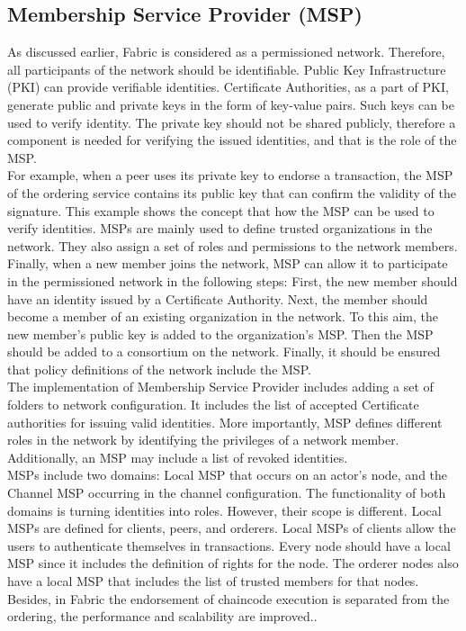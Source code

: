 \documentclass[sigconf,natbib=false]{acmart}
\begin{document}
    \subsection{Membership Service Provider (MSP)}
    As discussed earlier, Fabric is considered as a permissioned network. Therefore, all participants of the network should be identifiable. Public Key Infrastructure (PKI) can provide verifiable identities. Certificate Authorities, as a part of PKI, generate public and private keys in the form of key-value pairs. Such keys can be used to verify identity. The private key should not be shared publicly, therefore a component is needed for verifying the issued identities, and that is the role of the MSP.\\
    For example, when a peer uses its private key to endorse a transaction, the MSP of the ordering service contains its public key that can confirm the validity of the signature. This example shows the concept that how the MSP can be used to verify identities. MSPs are mainly used to define trusted organizations in the network. They also assign a set of roles and permissions to the network members. Finally, when a new member joins the network, MSP can allow it to participate in the permissioned network in the following steps:
    First, the new member should have an identity issued by a Certificate Authority. Next, the member should become a member of an existing organization in the network. To this aim, the new member's public key is added to the organization's MSP. Then the MSP should be added to a consortium on the network. Finally, it should be ensured that policy definitions of the network include the MSP.\\
    The implementation of Membership Service Provider includes adding a set of folders to network configuration. It includes the list of accepted Certificate authorities for issuing valid identities. More importantly, MSP defines different roles in the network by identifying the privileges of a network member. Additionally, an MSP may include a list of revoked identities.\\
    MSPs include two domains: Local MSP that occurs on an actor's node, and the Channel MSP occurring in the channel configuration. The functionality of both domains is turning identities into roles. However, their scope is different.
    Local MSPs are defined for clients, peers, and orderers. Local MSPs of clients allow the users to authenticate themselves in transactions. Every node should have a local MSP since it includes the definition of rights for the node. The orderer nodes also have a local MSP that includes the list of trusted members for that nodes. Besides, in Fabric the endorsement of chaincode execution is separated from the ordering, the performance and scalability are improved.\cite{membershipService}.
\end{document}
